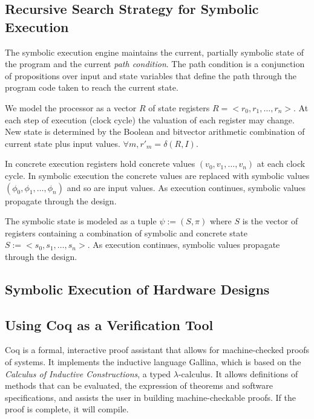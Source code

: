 \subsection{Recursive Search Strategy for Symbolic Execution}


The symbolic execution engine
maintains the current, partially symbolic state of the program and the current
\emph{path condition}. The path condition is a conjunction of propositions over
input and state variables that define the path through the program code taken to
reach the current state.


We model the processor as a vector $R$ of state registers $R = <r_0, r_1,
\ldots, r_n>$. At each step of execution (clock cycle) the valuation of each
register may change. New state is determined by the Boolean and bitvector
arithmetic combination of current state plus input values. $\forall m, r'_m =
\delta(R,I)$.

In concrete execution registers hold concrete values $(v_0, v_1, \ldots, v_n)$
at each clock cycle. In symbolic execution the concrete values are replaced with
symbolic values $(\phi_0, \phi_1, \ldots, \phi_n)$ and so are input values.
As execution continues, symbolic values propagate through the design.

The symbolic state is modeled as a tuple $\psi := (S,\pi)$ where $S$ is the
vector of registers containing a combination of symbolic and concrete state $S
:= <s_0, s_1, \ldots, s_n>$. As execution continues, symbolic values propagate
through the design.



\subsection{Symbolic Execution of Hardware Designs}

\subsection{Using Coq as a Verification Tool}
Coq is a formal, interactive proof assistant that allows for machine-checked proofs of systems. 
It implements the inductive language Gallina, which is based on the \textit{Calculus of Inductive Constructions}, a typed $\lambda$-calculus. It allows definitions of methods that can be evaluated, the expression of theorems and software specifications, and assists the user in building machine-checkable proofs. If the proof is complete, it will compile.


